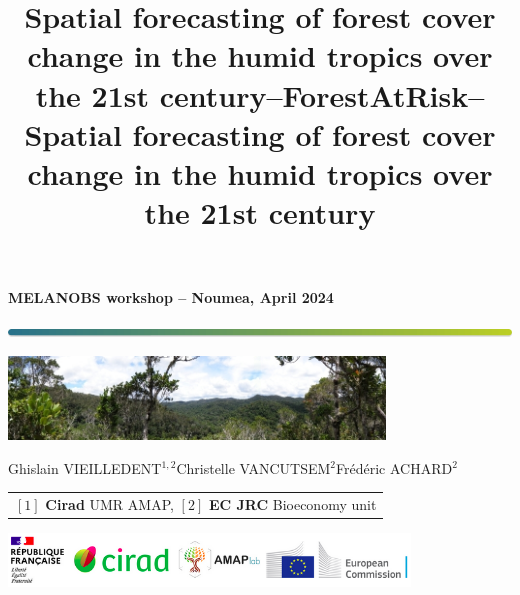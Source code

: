\documentclass[10pt,table,dvipsnames,compress]{beamer}
\date{}
\title{Spatial forecasting of forest cover change in the humid tropics over the 21st century}
\title[forestatrisk]{--ForestAtRisk--\\Spatial forecasting of forest cover change in the humid tropics over the 21st century}
\begin{document}

{
  \begin{frame}
  \begin{center}
  \small{\textbf{MELANOBS workshop -- Noumea, April 2024}}
  \end{center}
  \vspace{-0.5cm}
  \titlepage %
  \vspace{-3cm}
  \begin{center}
    \includegraphics[width=\textwidth]{figs/Barre_couleur}
    
    \vspace{0.25cm}
    
    \includegraphics[width=10cm]{figs/Banniere}
    
    \small{Ghislain VIEILLEDENT$^{1, 2}$\hspace{0.25cm}Christelle VANCUTSEM$^{2}$\hspace{0.25cm}Frédéric ACHARD$^{2}$}
      
    \vspace{0.25cm}
    
    {\scriptsize
      \begin{tabular}{l}
        $[1]$ \textbf{Cirad} UMR AMAP, $[2]$ \textbf{EC JRC} Bioeconomy unit
      \end{tabular}
    }
    
    \includegraphics[width=0.8\textwidth]{figs/partners_logos}
    
  \end{center}
  \end{frame}
}
\end{document}
